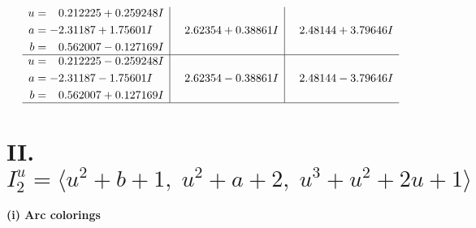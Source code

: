 \documentclass[1p]{elsarticle_modified}
\theoremstyle{definition}
\begin{document}
$$\begin{array}{c|c|c}
\begin{aligned}
u &= \phantom{-}0.212225 + 0.259248 I \\
a &= -2.31187 + 1.75601 I \\
b &= \phantom{-}0.562007 - 0.127169 I\end{aligned}
 & \phantom{-}2.62354 + 0.38861 I & \phantom{-}2.48144 + 3.79646 I \\ \hline\begin{aligned}
u &= \phantom{-}0.212225 - 0.259248 I \\
a &= -2.31187 - 1.75601 I \\
b &= \phantom{-}0.562007 + 0.127169 I\end{aligned}
 & \phantom{-}2.62354 - 0.38861 I & \phantom{-}2.48144 - 3.79646 I\\
 \hline 
 \end{array}$$\newpage\newpage\renewcommand{\arraystretch}{1}
\centering \section*{II. $I^u_{2}= \langle u^2+b+1,\;u^2+a+2,\;u^3+u^2+2 u+1 \rangle$}
\flushleft \textbf{(i) Arc colorings}\\
\end{document}
